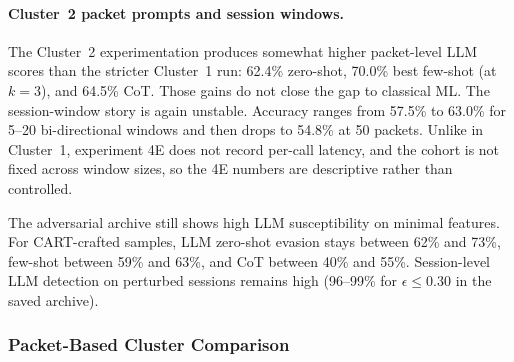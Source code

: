 \documentclass[letterpaper,twocolumn,10pt]{article}
\begin{document}
\paragraph{Cluster~2 packet prompts and session windows.}
The Cluster~2 experimentation produces somewhat higher packet-level LLM scores than the stricter Cluster~1 run: 62.4\% zero-shot, 70.0\% best few-shot (at $k=3$), and 64.5\% CoT. Those gains do not close the gap to classical ML. The session-window story is again unstable. Accuracy ranges from 57.5\% to 63.0\% for 5--20 bi-directional windows and then drops to 54.8\% at 50 packets. Unlike in Cluster~1, experiment 4E does not record per-call latency, and the cohort is not fixed across window sizes, so the 4E numbers are descriptive rather than controlled.

The adversarial archive still shows high LLM susceptibility on minimal features. For CART-crafted samples, LLM zero-shot evasion stays between 62\% and 73\%, few-shot between 59\% and 63\%, and CoT between 40\% and 55\%. Session-level LLM detection on perturbed sessions remains high (96--99\% for $\epsilon \leq 0.30$ in the saved archive). 

\subsubsection{Packet-Based Cluster Comparison}
\end{document}
